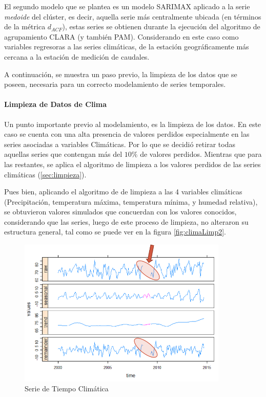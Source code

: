 \documentclass[12pt,oneside]{book}\usepackage[]{graphicx}\usepackage[]{color}
\theoremstyle{definition} %
\begin{document}
El segundo modelo que se plantea es un modelo SARIMAX aplicado a la serie \textit{medoide} del clúster, es decir, aquella serie más centralmente ubicada (en términos de la métrica $d_{ACF}$), estas series se obtienen durante la ejecución del algoritmo de agrupamiento CLARA (y también PAM). Considerando en este caso como variables regresoras a las series climáticas, de la estación geográficamente más cercana a la estación de medición de caudales.

A continuación, se muestra un paso previo, la limpieza de los datos que se poseen, necesaria para un correcto modelamiento de series temporales.

\paragraph{Limpieza de Datos de Clima} Un punto importante previo al modelamiento, es la limpieza de los datos. En este caso se cuenta con una alta presencia de valores perdidos especialmente en las series asociadas a variables Climáticas. Por lo que se decidió retirar todas aquellas series que contengan más del $10\%$ de valores perdidos. 
Mientras que para las restantes, se aplica el algoritmo de limpieza a los valores perdidos de las series climáticas  (\ref{sec:limpieza}). 

Pues bien, aplicando el algoritmo de de limpieza a las 4 variables climáticas (Precipitación, temperatura máxima, temperatura mínima, y humedad relativa), se obtuvieron valores simulados que concuerdan con los valores conocidos, considerando que las series, luego de este proceso de limpieza, no alteraron su estructura general, tal como se puede ver en la figura \ref{fig:climaLimp2}.



\begin{figure}[H]
\centering
\includegraphics[width=10cm]{Cap3-Metodologia/limpieza.png}
\caption{Serie de Tiempo Climática}
\label{fig:clima2}

\end{figure}
\end{document}
